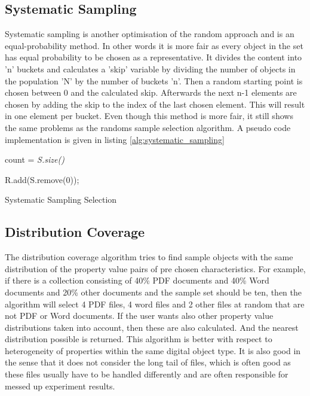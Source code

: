 \subsection{Systematic Sampling}
Systematic sampling is another optimisation of the random approach and is an equal-probability method. In other words it is more fair as every object in the set has equal probability to be chosen as a representative. It divides the content into 'n' buckets and calculates a 'skip' variable by dividing the number of objects in the population 'N' by the number of buckets 'n'. Then a random starting point is chosen between 0 and the calculated skip. Afterwards the next n-1 elements are chosen by adding the skip to the index of the last chosen element.  This will result in one element per bucket.
Even though this method is more fair, it still shows the same problems as the randoms sample selection algorithm. A pseudo code implementation is given in listing \ref{alg:systematic_sampling}

\begin{algorithm}[H]
\SetAlgoLined
{}

 \BlankLine

count = \textit{S.size()}\; 
 
  {
    {  
   	R.add(S.remove(0));
   }
 }
 \caption{Systematic Sampling Selection}
 \label{alg:systematic_sampling}
\end{algorithm}

\subsection{Distribution Coverage}
The distribution coverage algorithm tries to find sample objects with the same distribution of the property value pairs of pre chosen characteristics. For example, if there is a collection consisting of 40\% PDF documents and 40\% Word documents and 20\% other documents and the sample set should be ten, then the algorithm will select 4 PDF files, 4 word files and 2 other files at random that are not PDF or Word documents.
If the user wants also other property value distributions taken into account, then these are also calculated. And the nearest distribution possible is returned.
This algorithm is better with respect to heterogeneity of properties within the same digital object type. It is also good in the sense that it does not consider the long tail of files, which is often good as these files usually have to be handled differently and are often responsible for messed up experiment results.

